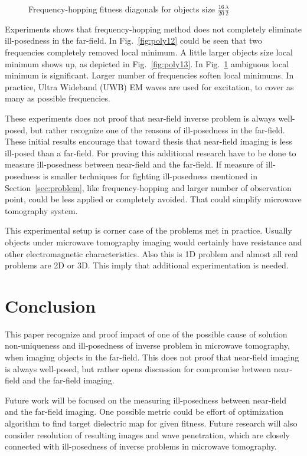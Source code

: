 \documentclass[conference]{IEEEtran}
\begin{document}
\begin{figure}[!t]
	
	\caption{Frequency-hopping fitness diagonals for objects size $\frac{16}{20}\frac{\lambda}{2}$}
	\label{fig:poly16}
\end{figure}

\par
Experiments shows that frequency-hopping method does not completely eliminate ill-posedness in the far-field.
In Fig.~\ref{fig:poly12} could be seen that two frequencies completely removed local minimum.
A little larger objects size local minimum shows up, as depicted in Fig.~\ref{fig:poly13}.
In Fig.~\ref{fig:poly16} ambiguous local minimum is significant.
Larger number of frequencies soften local minimums.
In practice, Ultra Wideband (UWB) \cite{UWBbible} EM waves are used for excitation,
to cover as many as possible frequencies.

\par
These experiments does not proof that near-field inverse problem is always well-posed,
but rather recognize one of the reasons of ill-posedness in the far-field.
These initial results encourage that toward thesis that
near-field imaging is less ill-posed than a far-field.
For proving this additional research have to be done to measure 
ill-posedness between near-field and the far-field.
If measure of ill-posedness is smaller
techniques for fighting ill-posedness mentioned in Section~\ref{sec:problem},
like frequency-hopping and larger number of observation point,
could be less applied or completely avoided.
That could simplify microwave tomography system.
\par
This experimental setup is corner case of the problems met in practice.
Usually objects under microwave tomography imaging would certainly have resistance 
and other electromagnetic characteristics.
Also this is 1D problem and almost all real problems are 2D or 3D.
This imply that additional experimentation is needed.


\section{Conclusion}
This paper recognize and proof impact of one of the possible cause of solution non-uniqueness 
and ill-posedness of inverse problem in microwave tomography,
when imaging objects in the far-field.
This does not proof that near-field imaging is always well-posed,
but rather opens discussion for compromise between near-field and the far-field imaging.
\par
Future work will be focused on the measuring ill-posedness 
between near-field and the far-field imaging.
One possible metric could be effort of optimization algorithm 
to find target dielectric map for given fitness.
Future research will also consider resolution of resulting images and wave penetration,
which are closely connected with ill-posedness of inverse problems in microwave tomography.
\end{document}
